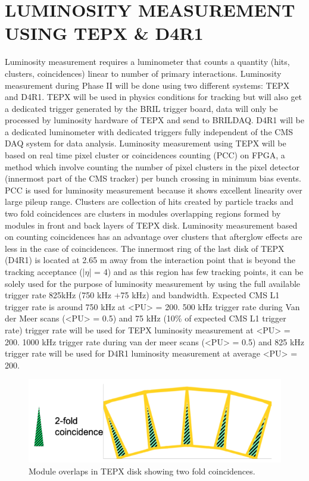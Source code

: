 \documentclass[a4paper,11pt]{article}
\begin{document}
\section{LUMINOSITY MEASUREMENT USING TEPX \& D4R1}
Luminosity measurement requires a luminometer that counts a quantity (hits, clusters, coincidences) linear to number of primary interactions. Luminosity measurement during Phase II will be done using two different systems: TEPX and D4R1. TEPX will be used in physics conditions for tracking but will also get a dedicated trigger generated by the BRIL trigger board, data will only be processed by luminosity hardware of TEPX and send to BRILDAQ. D4R1 will be a dedicated luminometer with dedicated triggers fully independent of the CMS DAQ system for data analysis. Luminosity measurement using TEPX will be based on real time pixel cluster or coincidences counting (PCC) on FPGA, a method which involve counting the number of pixel clusters in the pixel detector (innermost part of the CMS tracker) per bunch crossing in minimum bias events. PCC is used for luminosity measurement because it shows excellent linearity over large pileup range. Clusters are collection of hits created by particle tracks and two fold coincidences are clusters in modules overlapping regions formed by modules in front and back layers of TEPX disk. Luminosity measurement based on counting coincidences has an advantage over clusters that afterglow effects are less in the case of coincidences. The innermost ring of the last disk of TEPX (D4R1) is located at 2.65 m away from the interaction point that is beyond the tracking acceptance (|$\eta$| = 4) and as this region has few tracking points, it can be solely used for the purpose of luminosity measurement by using the full available trigger rate 825kHz (750 kHz +75 kHz) and bandwidth. Expected CMS L1 trigger rate is around 750 kHz at <PU> = 200. 500 kHz trigger rate during Van der Meer scans (<PU> = 0.5) and 75 kHz (10\% of expected CMS L1 trigger rate) trigger rate will be used for TEPX luminosity measurement at <PU> = 200. 1000 kHz trigger rate during van der meer scans (<PU> = 0.5) and 825 kHz trigger rate will be used for D4R1 luminosity measurement at average <PU> = 200.

\begin{figure}[htb]
  \centering
  \includegraphics[width=0.6\columnwidth]{twofold1_new.png}
  \caption{Module overlaps in TEPX disk showing two fold coincidences.}
  \label{fig:CMS}
\end{figure}
\end{document}
